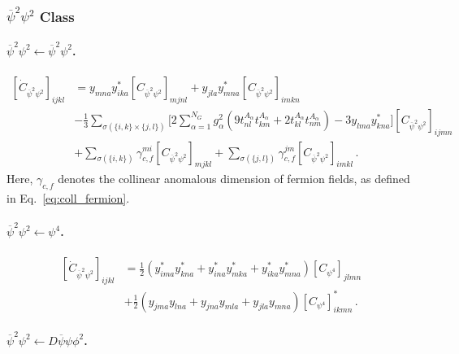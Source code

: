 \subsubsection{\texorpdfstring{$\overline \psi^2 \psi^2$ Class}{barpsi2psi2 Class}}

\paragraph{$\overline \psi^2 \psi^2 \leftarrow \overline \psi^2 \psi^2$.}

\begin{align}
    \left[\dot C_{\overline \psi^2 \psi^2}\right]_{ijkl} &= y_{mna}y^*_{ika}\left[ C_{\overline \psi^2 \psi^2}\right]_{mjnl}
    + y_{jla}y^*_{mna}\left[ C_{\overline \psi^2 \psi^2}\right]_{imkn} \nonumber \\
    &- \frac{1}{3}\sum_{\sigma(\{i,k\}\times\{j,l\})}\Bigg[
    2 \sum_{\alpha=1}^{N_G} g_\alpha^2 (9 t^{A_\alpha}_{nl}t^{A_\alpha}_{km} + 2 t^{A_\alpha}_{kl}t^{A_\alpha}_{nm}) - 3y_{lma}y^*_{kna}
    \Bigg] \left[ C_{\overline \psi^2 \psi^2}\right]_{ijmn} \nonumber \\
    &+ \sum_{\sigma(\{i,k\})} \gamma_{c,f}^{mi} \left[ C_{\overline \psi^2 \psi^2}\right]_{mjkl} + \sum_{\sigma(\{j,l\})} \gamma_{c,f}^{jm} \left[ C_{\overline \psi^2 \psi^2}\right]_{imkl}\,.
\end{align}
Here, $\gamma_{c,f}$ denotes the collinear anomalous dimension of fermion fields, as defined in Eq.~\eqref{eq:coll_fermion}.

\paragraph{$\overline \psi^2 \psi^2 \leftarrow \psi^4$.}

\begin{align}
    \left[\dot C_{\overline \psi^2 \psi^2}\right]_{ijkl} &= 
    \frac{1}{2}(y^*_{ima}y^*_{kna} + y^*_{ina}y^*_{mka} + y^*_{ika}y^*_{mna})
    \left[C_{\psi^4}\right]_{jlmn} \nonumber \\
    &+ 
    \frac{1}{2}(y_{jma}y_{lna} + y_{jna}y_{mla} + y_{jla}y_{mna})
    \left[C_{\psi^4}\right]^*_{ikmn}
    \,.
\end{align}

\paragraph{$\overline \psi^2 \psi^2 \leftarrow D \overline \psi \psi \phi^2$.}

